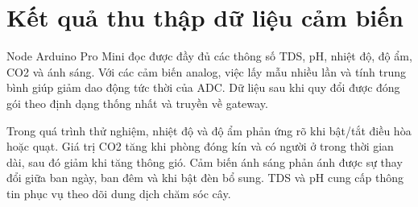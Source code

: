 \section{Kết quả thu thập dữ liệu cảm biến}
Node Arduino Pro Mini đọc được đầy đủ các thông số TDS, pH, nhiệt độ, độ ẩm, CO2 và ánh sáng. Với các cảm biến analog, việc lấy mẫu nhiều lần và tính trung bình giúp giảm dao động tức thời của ADC. Dữ liệu sau khi quy đổi được đóng gói theo định dạng thống nhất và truyền về gateway.

Trong quá trình thử nghiệm, nhiệt độ và độ ẩm phản ứng rõ khi bật/tắt điều hòa hoặc quạt. Giá trị CO2 tăng khi phòng đóng kín và có người ở trong thời gian dài, sau đó giảm khi tăng thông gió. Cảm biến ánh sáng phản ánh được sự thay đổi giữa ban ngày, ban đêm và khi bật đèn bổ sung. TDS và pH cung cấp thông tin phục vụ theo dõi dung dịch chăm sóc cây.
